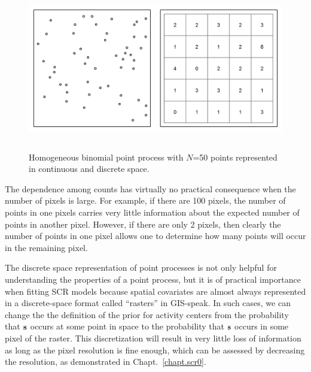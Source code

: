 \begin{figure}%
\centering
\includegraphics[width=5in,height=2.5in]{Ch11/figs/homoPlots}
\label{state-space.fig.homo}
\caption{Homogeneous binomial point process with $N$=50 points
  represented in continuous and discrete space.}
\end{figure}

The dependence among counts has virtually
no practical consequence when the number of pixels is large. For
example, if there are 100 pixels, the number of points in one pixels
carries very little information about the expected number of points in another
pixel. However, if there are only 2 pixels, then clearly the number of
points in one pixel allows one to determine how many points will occur in the
remaining pixel.

  The discrete space representation of %
  point processes is not only helpful for understanding the properties
  of a point process, but it is of practical importance when fitting SCR models
  because spatial covariates are almost always represented in a
  discrete-space format called ``rasters'' in GIS-speak. In such
  cases, we can change the the definition of the prior for
  activity centers from the probability that $\bf s$ occurs at some
  point in space to the probability that $\bf s$ occurs in some pixel
  of the raster. This discretization will result in very little loss
  of information as long as the pixel resolution is fine enough, which
  can be assessed by decreasing the resolution, as
  demonstrated in Chapt.~\ref{chapt.scr0}.


